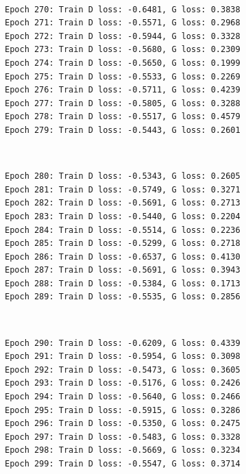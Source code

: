 \documentclass[11pt]{article}
\begin{document}
    \begin{center}
    \end{center}
    { \hspace*{\fill} \\}
    
    \begin{Verbatim}[commandchars=\\\{\}]
Epoch 270: Train D loss: -0.6481, G loss: 0.3838
Epoch 271: Train D loss: -0.5571, G loss: 0.2968
Epoch 272: Train D loss: -0.5944, G loss: 0.3328
Epoch 273: Train D loss: -0.5680, G loss: 0.2309
Epoch 274: Train D loss: -0.5650, G loss: 0.1999
Epoch 275: Train D loss: -0.5533, G loss: 0.2269
Epoch 276: Train D loss: -0.5711, G loss: 0.4239
Epoch 277: Train D loss: -0.5805, G loss: 0.3288
Epoch 278: Train D loss: -0.5517, G loss: 0.4579
Epoch 279: Train D loss: -0.5443, G loss: 0.2601

    \end{Verbatim}

    \begin{center}
    \end{center}
    { \hspace*{\fill} \\}
    
    \begin{Verbatim}[commandchars=\\\{\}]
Epoch 280: Train D loss: -0.5343, G loss: 0.2605
Epoch 281: Train D loss: -0.5749, G loss: 0.3271
Epoch 282: Train D loss: -0.5691, G loss: 0.2713
Epoch 283: Train D loss: -0.5440, G loss: 0.2204
Epoch 284: Train D loss: -0.5514, G loss: 0.2236
Epoch 285: Train D loss: -0.5299, G loss: 0.2718
Epoch 286: Train D loss: -0.6537, G loss: 0.4130
Epoch 287: Train D loss: -0.5691, G loss: 0.3943
Epoch 288: Train D loss: -0.5384, G loss: 0.1713
Epoch 289: Train D loss: -0.5535, G loss: 0.2856

    \end{Verbatim}

    \begin{center}
    \end{center}
    { \hspace*{\fill} \\}
    
    \begin{Verbatim}[commandchars=\\\{\}]
Epoch 290: Train D loss: -0.6209, G loss: 0.4339
Epoch 291: Train D loss: -0.5954, G loss: 0.3098
Epoch 292: Train D loss: -0.5473, G loss: 0.3605
Epoch 293: Train D loss: -0.5176, G loss: 0.2426
Epoch 294: Train D loss: -0.5640, G loss: 0.2466
Epoch 295: Train D loss: -0.5915, G loss: 0.3286
Epoch 296: Train D loss: -0.5350, G loss: 0.2475
Epoch 297: Train D loss: -0.5483, G loss: 0.3328
Epoch 298: Train D loss: -0.5669, G loss: 0.3234
Epoch 299: Train D loss: -0.5547, G loss: 0.3714

    \end{Verbatim}
\end{document}
